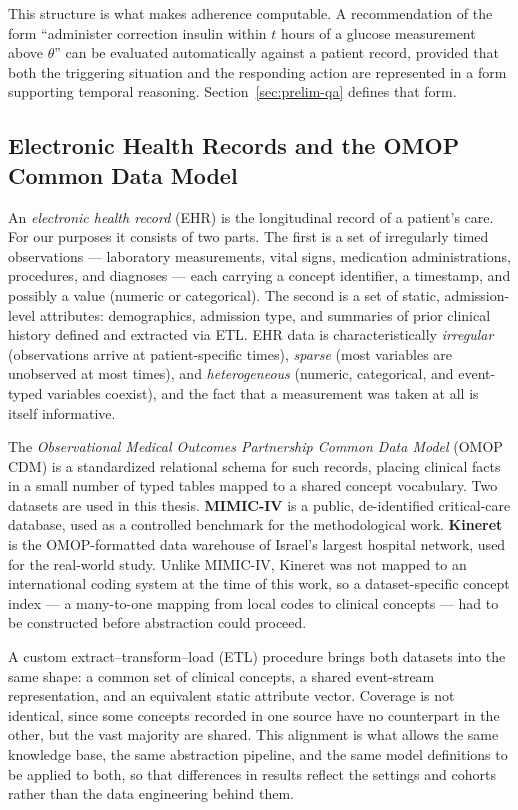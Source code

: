 This structure is what makes adherence computable. A recommendation of the form ``administer correction insulin within $t$ hours of a glucose measurement above $\theta$'' can be evaluated automatically against a patient record, provided that both the triggering situation and the responding action are represented in a form supporting temporal reasoning. Section~\ref{sec:prelim-qa} defines that form.

\subsection{Electronic Health Records and the OMOP Common Data Model}

An \emph{electronic health record} (EHR) is the longitudinal record of a patient's care. For our purposes it consists of two parts. The first is a set of irregularly timed observations --- laboratory measurements, vital signs, medication administrations, procedures, and diagnoses --- each carrying a concept identifier, a timestamp, and possibly a value (numeric or categorical). The second is a set of static, admission-level attributes: demographics, admission type, and summaries of prior clinical history defined and extracted via ETL. EHR data is characteristically \emph{irregular} (observations arrive at patient-specific times), \emph{sparse} (most variables are unobserved at most times), and \emph{heterogeneous} (numeric, categorical, and event-typed variables coexist), and the fact that a measurement was taken at all is itself informative.

The \emph{Observational Medical Outcomes Partnership Common Data Model} (OMOP CDM) is a standardized relational schema for such records, placing clinical facts in a small number of typed tables mapped to a shared concept vocabulary. Two datasets are used in this thesis. \textbf{MIMIC-IV} \citep{johnson2023mimiciv} is a public, de-identified critical-care database, used as a controlled benchmark for the methodological work. \textbf{Kineret} \citep{kineret-israel-largest-hospital-network-omop-common-data-model} is the OMOP-formatted data warehouse of Israel's largest hospital network, used for the real-world study. Unlike MIMIC-IV, Kineret was not mapped to an international coding system at the time of this work, so a dataset-specific concept index --- a many-to-one mapping from local codes to clinical concepts --- had to be constructed before abstraction could proceed.

A custom extract--transform--load (ETL) procedure brings both datasets into the same shape: a common set of clinical concepts, a shared event-stream representation, and an equivalent static attribute vector. Coverage is not identical, since some concepts recorded in one source have no counterpart in the other, but the vast majority are shared. This alignment is what allows the same knowledge base, the same abstraction pipeline, and the same model definitions to be applied to both, so that differences in results reflect the settings and cohorts rather than the data engineering behind them.

